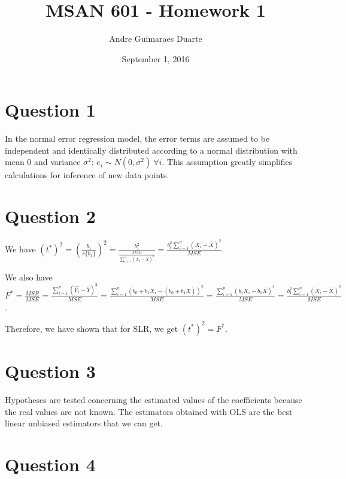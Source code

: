 \documentclass[]{article}
\title{MSAN 601 - Homework 1}
\author{Andre Guimaraes Duarte}
\date{September 1, 2016}
\begin{document}
\maketitle

\section*{Question 1}

In the normal error regression model, the error terms are assumed to be independent and identically distributed according to a normal distribution with mean $0$ and variance $\sigma^2$: $e_i \sim N(0, \sigma^2)\ \forall i$. This assumption greatly simplifies calculations for inference of new data points.

\section*{Question 2}
We have $(t^*)^2 = (\frac{b_1}{s\{b_1\}})^2 = \frac{b_1^2}{\frac{MSE}{\sum_{i=1}^n{(X_i - \bar{X})^2}}} = \frac{b_i^2 \sum_{i=1}^n{(X_i - \bar{X})^2}}{MSE}$.

We also have $F^* = \frac{MSR}{MSE} = \frac{\sum_{i=1}^n{(\hat{Y_i} - \bar{Y})^2}}{MSE} = \frac{\sum_{i=1}^n{(b_0 + b_1 X_i - (b_0 + b_1\bar{X}))^2}}{MSE} = \frac{\sum_{i=1}^n{(b_1 X_i - b_1\bar{X})^2}}{MSE} = \frac{b_1^2 \sum_{i=1}^n{(X_i - \bar{X})^2}}{MSE}$.

Therefore, we have shown that for SLR, we get $(t^*)^2 = F^*$.

\section*{Question 3}

Hypotheses are tested concerning the estimated values of the coefficients because the real values are not known. The estimators obtained with OLS are the best linear unbiased estimators that we can get.

\section*{Question 4}
\end{document}
